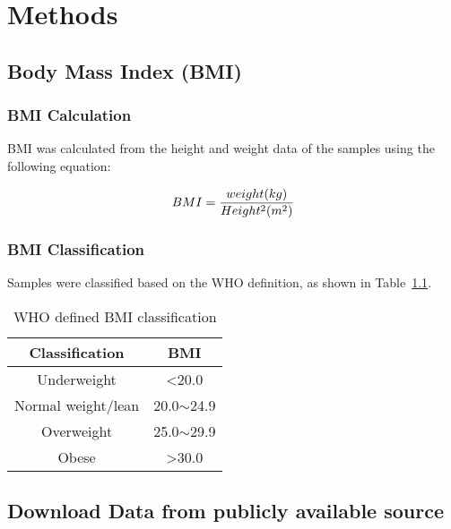\chapter{Methods}
\label{ch:methods}

\section{Body Mass Index (BMI)}
\label{sec:bmi}

\subsection{BMI Calculation}
\label{subsec:bmicalc}

BMI was calculated from the height and weight data of the samples using the following equation:

\begin{equation}
    \label{eq:bmicalc}
    BMI = \frac{weight (kg)}{Height^2(m^2)}\\
\end{equation}

\subsection{BMI Classification}
\label{subsec:bmiclassification}

Samples were classified based on the WHO definition, as shown in Table~\ref{tab:whobmiclass}.
\begin{table}[hb]
    \caption{WHO defined BMI classification}
    \label{tab:whobmiclass}
    \begin{center}
        \begin{tabular}{|c|c|}
            \hline
            \bfseries {Classification} & \bfseries {BMI}\\
            \hline
            Underweight & \textless 20.0\\
            Normal weight/lean & 20.0$\sim$24.9\\
            Overweight & 25.0$\sim$29.9\\
            Obese & \textgreater 30.0\\
            \hline
        \end{tabular}
    \end{center}
\end{table}

\section{Download Data from publicly available source}
\label{sec:data}

